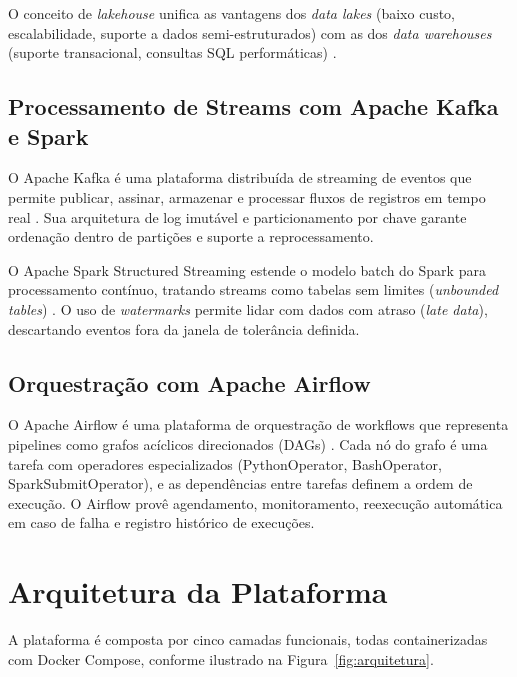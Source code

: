 O conceito de \textit{lakehouse} unifica as vantagens dos \textit{data lakes} (baixo custo,
escalabilidade, suporte a dados semi-estruturados) com as dos \textit{data warehouses}
(suporte transacional, consultas SQL performáticas) \cite{armbrust2021lakehouse}.

\subsection{Processamento de Streams com Apache Kafka e Spark}

O Apache Kafka é uma plataforma distribuída de streaming de eventos que permite publicar,
assinar, armazenar e processar fluxos de registros em tempo real \cite{kreps2011kafka}.
Sua arquitetura de log imutável e particionamento por chave garante ordenação dentro de
partições e suporte a reprocessamento.

O Apache Spark Structured Streaming estende o modelo batch do Spark para processamento
contínuo, tratando streams como tabelas sem limites (\textit{unbounded tables})
\cite{zaharia2016apache}. O uso de \textit{watermarks} permite lidar com dados com
atraso (\textit{late data}), descartando eventos fora da janela de tolerância definida.

\subsection{Orquestração com Apache Airflow}

O Apache Airflow é uma plataforma de orquestração de workflows que representa pipelines
como grafos acíclicos direcionados (DAGs) \cite{airflow2024docs}. Cada nó do grafo é uma
tarefa com operadores especializados (PythonOperator, BashOperator, SparkSubmitOperator),
e as dependências entre tarefas definem a ordem de execução. O Airflow provê agendamento,
monitoramento, reexecução automática em caso de falha e registro histórico de execuções.

\section{Arquitetura da Plataforma}

A plataforma é composta por cinco camadas funcionais, todas containerizadas com Docker
Compose, conforme ilustrado na Figura~\ref{fig:arquitetura}.

